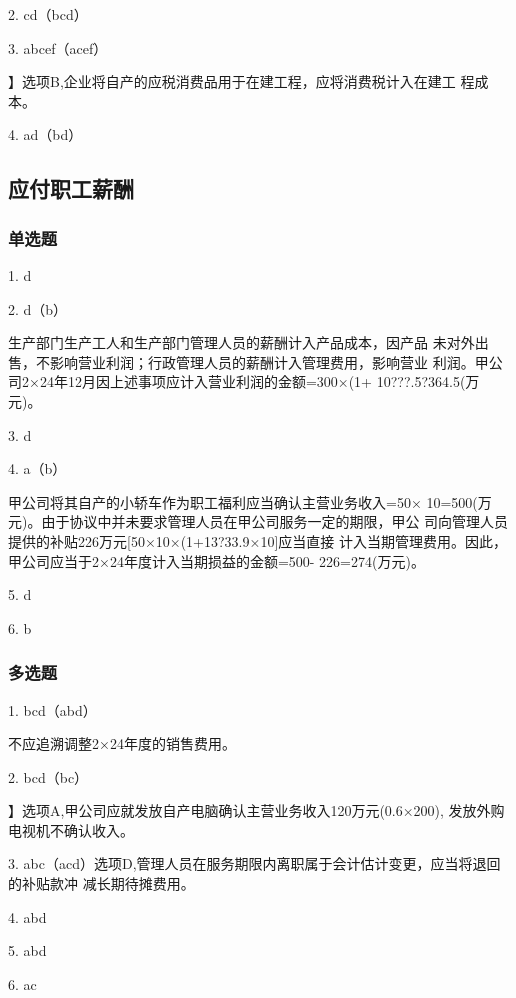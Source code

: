 \documentclass[UTF8,12pt]{ctexart}
\numberwithin{equation}{section} %
\numberwithin{figure}{section}
\numberwithin{table}{section}
\begin{document}
	2. cd（bcd）
	
	3. abcef（acef）
	
	】选项B,企业将自产的应税消费品用于在建工程，应将消费税计入在建工
	程成本。
	
	4. ad（bd）
	
	\subsection{应付职工薪酬}
	\subsubsection{单选题}
	1. d
	
	2. d（b）
	
	生产部门生产工人和生产部门管理人员的薪酬计入产品成本，因产品
	未对外出售，不影响营业利润；行政管理人员的薪酬计入管理费用，影响营业
	利润。甲公司2×24年12月因上述事项应计入营业利润的金额=300×(1+
	10???.5?364.5(万元)。
	
	3. d
	
	4. a（b）
	
	甲公司将其自产的小轿车作为职工福利应当确认主营业务收入=50×
	10=500(万元)。由于协议中并未要求管理人员在甲公司服务一定的期限，甲公
	司向管理人员提供的补贴226万元[50×10×(1+13?33.9×10]应当直接
	计入当期管理费用。因此，甲公司应当于2×24年度计入当期损益的金额=500-
	226=274(万元)。
	
	5. d
	
	6. b
	
	\subsubsection{多选题}
	1. bcd（abd）
	
	不应追溯调整2×24年度的销售费用。
	
	2. bcd（bc）
	
	】选项A,甲公司应就发放自产电脑确认主营业务收入120万元(0.6×200),
	发放外购电视机不确认收入。
	
	3. abc（acd）选项D,管理人员在服务期限内离职属于会计估计变更，应当将退回的补贴款冲
	减长期待摊费用。
	
	4. abd
	
	5. abd
	
	6. ac
	
\end{document}
